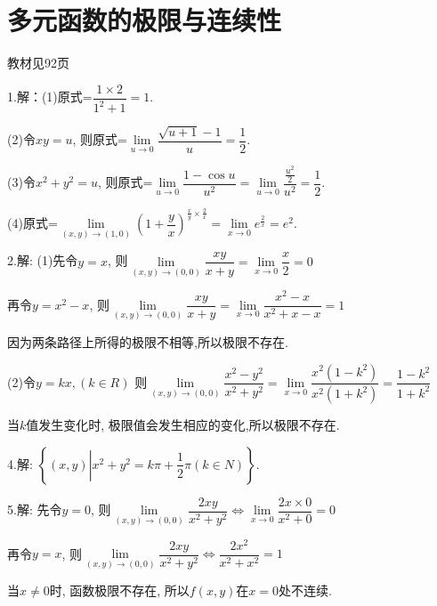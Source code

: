 \section{多元函数的极限与连续性}
\begin{flushright}
  \color{zhanqing!80}
   教材见92页
\end{flushright}

  1.解：(1)原式=$ \dfrac{{1 \times 2}}{{{1^2} + 1}} = 1.$

  (2)令$xy = u$,
  则原式=$\mathop {\lim }\limits_{u \to 0} \dfrac{{\sqrt {u + 1}  - 1}}{u} = \dfrac{1}{2}.$

  (3)令${x^2} + {y^2} = u$,
  则原式=$\mathop {\lim }\limits_{u \to 0} \dfrac{{1 - \cos u}}{{{u^2}}} = \mathop {\lim }\limits_{u \to 0} \dfrac{{\frac{{{u^2}}}{2}}}{{{u^2}}} = \dfrac{1}{2}.$

  (4)原式=$\mathop {\lim }\limits_{(x,y) \to (1,0)} {(1 + \dfrac{y}{x})^{\frac{x}{y} \times \frac{2}{x}}} = \mathop {\lim }\limits_{x \to 0} {e^{\frac{2}{x}}} = {e^2}$.

  2.解: (1)先令$y = x$,
  则$\mathop {\lim }\limits_{(x,y) \to (0,0)}  \dfrac{{xy}}{{x + y}} =  \mathop {\lim }\limits_{x \to 0} \dfrac{x}{2} = 0$

  再令$y = {x^2} - x$,
  则$\mathop {\lim }\limits_{(x,y) \to (0,0)} \dfrac{{xy}}{{x + y}} = \mathop {\lim }\limits_{x \to 0} \dfrac{{{x^2} - x}}{{{x^2} + x - x}} = 1$

  因为两条路径上所得的极限不相等,所以极限不存在.

  (2)令$y = kx,(k \in R)$
  则$ \mathop {\lim }\limits_{(x,y) \to (0,0)} \dfrac{{{x^2} - {y^2}}}{{{x^2} + {y^2}}} = \mathop {\lim }\limits_{x \to 0} \dfrac{{{x^2}(1 - {k^2})}}{{{x^2}(1 + {k^2})}} = \dfrac{{1 - {k^2}}}{{1 + {k^2}}}$

  当$k$值发生变化时, 极限值会发生相应的变化,所以极限不存在.

  4.解: $ \left\{ (x,y)\left|{x^2} + {y^2} = k\pi  + \dfrac{1}{2}\pi (k \in N) \right.\right\}$.

  5.解: 先令$ y = 0$,
  则$ \mathop {\lim }\limits_{(x,y) \to (0,0)} \dfrac{{2xy}}{{{x^2} + {y^2}}} \Leftrightarrow \mathop {\lim }\limits_{x \to 0} \dfrac{{2x \times 0}}{{{x^2} + 0}} = 0$

  再令$ y = x$,
  则$ \mathop {\lim }\limits_{(x,y) \to (0,0)} \dfrac{{2xy}}{{{x^2} + {y^2}}} \Leftrightarrow \dfrac{{2{x^2}}}{{{x^2} + {x^2}}} = 1$

  当$ x \ne 0 $时, 函数极限不存在,
  所以$f(x,y)$在$x=0$处不连续.

